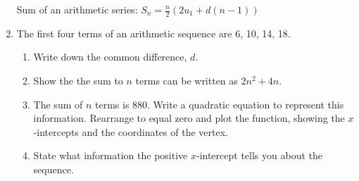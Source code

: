 \documentclass[12pt, twoside]{article}
\begin{document}
\begin{enumerate}
\newpage
Sum of an arithmetic series: $\displaystyle S_n=\frac{n}{2}(2u_1+d(n-1))$
\item The first four terms of an arithmetic sequence are 6, 10, 14, 18. 
\begin{enumerate}
    \item Write down the common difference, $d$. \vspace{0.5cm}
    \item Show the the sum to $n$ terms can be written as $2n^2+4n$.\vspace{3cm}
    \item The sum of $n$ terms is 880. Write a quadratic equation to represent this information. Rearrange to equal zero and plot the function, showing the $x$-intercepts and the coordinates of the vertex.\vspace{2cm}
    \item State what information the positive $x$-intercept tells you about the sequence.
\end{enumerate}
\vspace{3cm}
\begin{center}
\end{center}

\end{enumerate}
\end{document}
